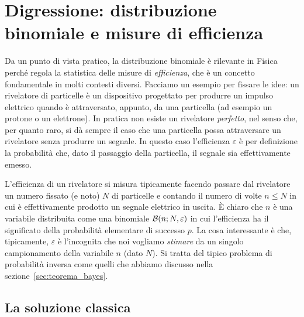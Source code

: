 \section{Digressione: distribuzione binomiale e misure di efficienza}
\label{sec:misure_efficienza}

Da un punto di vista pratico, la distribuzione binomiale è rilevante in
Fisica perché regola la statistica delle misure di \emph{efficienza}, che è
un concetto fondamentale in molti contesti diversi. Facciamo un esempio per
fissare le idee: un rivelatore di particelle è un dispositivo progettato per
produrre un impulso elettrico quando è attraversato, appunto, da una
particella (ad esempio un protone o un elettrone). In pratica non esiste un
rivelatore \emph{perfetto}, nel senso che, per quanto raro, si dà sempre il
caso che una particella possa attraversare un rivelatore senza produrre un
segnale. In questo caso l'efficienza $\varepsilon$ è per definizione la
probabilità che, dato il passaggio della particella, il segnale sia
effettivamente emesso.

L'efficienza di un rivelatore si misura tipicamente facendo passare dal
rivelatore un numero fissato (e noto) $N$ di particelle e contando il numero
di volte $n \leq N$ in cui è effettivamente prodotto un segnale elettrico in
uscita. \`E chiaro che $n$ è una variabile distribuita come una binomiale
$\binomialpdf[N, \varepsilon]{n}$ in cui l'efficienza ha il significato della
probabilità elementare di successo $p$. La cosa interessante è che,
tipicamente, $\varepsilon$ è l'incognita che noi vogliamo \emph{stimare} da
un singolo campionamento della variabile $n$ (dato $N$). Si tratta del tipico
problema di probabilità inversa come quelli che abbiamo discusso nella
sezione~\ref{sec:teorema_bayes}.


\subsection{La soluzione classica}

